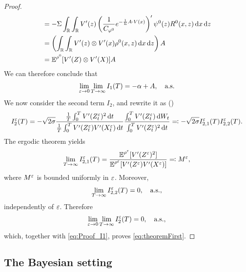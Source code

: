 \documentclass[10pt]{article}
\begin{document}
\begin{proof}
\begin{equation}
\begin{aligned}
	&= -\Sigma \int_{\mathbb{R}} \int_{\mathbb{R}} V'(z) \left ( \frac{1}{C_{\varphi^0}} e^{-\frac{1}{\Sigma} A\cdot V(x)} \right )' \psi^0(z) R^0(x,z) \,\mathrm{d} x \,\mathrm{d} z \\
	&= \left(\int_{\mathbb{R}} \int_{\mathbb{R}} V'(z) \otimes V'(x) \rho^0(x,z) \,\mathrm{d} x \,\mathrm{d} z\right)A\\
	&=  \operatorname{\mathbb{E}}^{\rho^0} [ V'(Z) \otimes V'(X) ]A
\end{aligned}
\end{equation}
We can therefore conclude that
\begin{equation}\label{eq:Proof_I1}
\lim_{\varepsilon \to 0} \lim_{T \to \infty} I_1(T) = -\alpha + A, \quad \text{a.s.}
\end{equation}
We now consider the second term $I_2$, and rewrite it as ()
\begin{equation}
	I^\varepsilon_2(T) = - \sqrt{2\sigma} \frac{\frac1T\int_0^T V'(Z^\varepsilon_t)^2 \,\mathrm{d} t}{\frac1T\int_0^T V'(Z^\varepsilon_t) V'(X^\varepsilon_t) \,\mathrm{d} t} \frac{\int_0^T V'(Z^\varepsilon_t) \,\mathrm{d} W_t}{\int_0^T V'(Z^\varepsilon_t)^2 \,\mathrm{d} t} \eqqcolon -\sqrt{2\sigma} I_{2,1}^\varepsilon(T)  I_{2,2}^\varepsilon(T).
\end{equation}
The ergodic theorem yields
\begin{equation}
	\lim_{T \to \infty} I_{2,1}^\varepsilon(T) = \frac{\operatorname{\mathbb{E}}^{\rho^\varepsilon}[V'(Z^\varepsilon)^2]}{\operatorname{\mathbb{E}}^{\rho^\varepsilon}[V'(Z^\varepsilon)V'(X^\varepsilon)]} \eqqcolon M^\varepsilon,
\end{equation}
where $M^\varepsilon$ is bounded uniformly in $\varepsilon$. Moreover, 
\begin{equation}
	\lim_{T \to \infty} I_{2,2}^\varepsilon(T) = 0, \quad \text{a.s.},
\end{equation}
independently of $\varepsilon$. Therefore
\begin{equation}
	\lim_{\varepsilon \to 0}\lim_{T \to \infty} I_2^\varepsilon(T) = 0, \quad \text{a.s.},
\end{equation}
which, together with \eqref{eq:Proof_I1}, proves \eqref{eq:theoremFirst}. 
\end{proof}

\subsection{The Bayesian setting}
\end{document}

